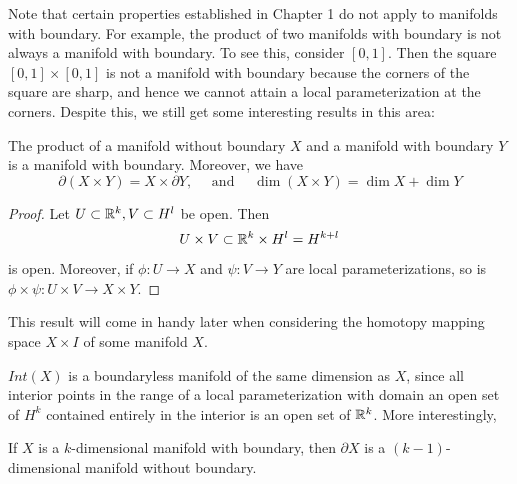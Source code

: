 Note that certain properties established in Chapter 1 do not apply to manifolds with boundary. For example, the product of two manifolds with boundary is not always a manifold with boundary. To see this, consider $[0,1]$. Then the square $[0,1] \times [0,1]$ is not a manifold with boundary because the corners of the square are sharp, and hence we cannot attain a local parameterization at the corners. Despite this, we still get some interesting results in this area:

\begin{prop}
    The product of a manifold without boundary $X$ and a manifold with boundary $Y$ is a manifold with boundary. Moreover, we have 
    \[\partial (X \times Y) = X \times \partial Y, \quad \text{ and } \quad \dim (X \times Y) = \dim X + \dim Y\]
\end{prop}

\begin{proof}
    Let $U \subset \mathbb{R}^k, V \subset H^l$ be open. Then 
    \[U \times V \subset \mathbb{R}^k \times H^l = H^{k+l}\]
    is open. Moreover, if $\phi: U \to X$ and $\psi: V \to Y$ are local parameterizations, so is $\phi \times \psi: U \times V \to X \times Y$. 
\end{proof}

This result will come in handy later when considering the homotopy mapping space $X \times I$ of some manifold $X$. 

$Int(X)$ is a boundaryless manifold of the same dimension as $X$, since all interior points in the range of a local parameterization with domain an open set of $H^k$ contained entirely in the interior is an open set of $\mathbb{R}^k$. More interestingly,

\begin{prop}
    If $X$ is a $k$-dimensional manifold with boundary, then $\partial X$ is a $(k-1)$-dimensional manifold without boundary. 
\end{prop}


